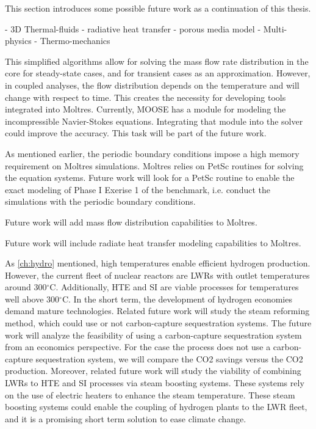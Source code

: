 This section introduces some possible future work as a continuation of this thesis.

- 3D Thermal-fluids
	- radiative heat transfer
	- porous media model
- Multi-physics
- Thermo-mechanics

This simplified algorithms allow for solving the mass flow rate distribution in the core for steady-state cases, and for transient cases as an approximation.
However, in coupled analyses, the flow distribution depends on the temperature and will change with respect to time.
This creates the necessity for developing tools integrated into Moltres.
Currently, MOOSE has a module for modeling the incompressible Navier-Stokes equations.
Integrating that module into the solver could improve the accuracy.
This task will be part of the future work.

As mentioned earlier, the periodic boundary conditions impose a high memory requirement on Moltres simulations.
Moltres relies on PetSc routines for solving the equation systems.
Future work will look for a PetSc routine to enable the exact modeling of Phase I Exerise 1 of the benchmark, i.e. conduct the simulations with the periodic boundary conditions.

Future work will add mass flow distribution capabilities to Moltres.

Future work will include radiate heat transfer modeling capabilities to Moltres.


As \ref{ch:hydro} mentioned, high temperatures enable efficient hydrogen production.
However, the current fleet of nuclear reactors are LWRs with outlet temperatures around 300$^{\circ}$C.
Additionally, HTE and SI are viable processes for temperatures well above 300$^{\circ}$C.
In the short term, the development of hydrogen economies demand mature technologies.
Related future work will study the steam reforming method, which could use or not carbon-capture sequestration systems.
The future work will analyze the feasibility of using a carbon-capture sequestration system from an economics perspective.
For the case the process does not use a carbon-capture sequestration system, we will compare the \gls{CO2} savings versus the \gls{CO2} production.
Moreover, related future work will study the viability of combining LWRs to HTE and SI processes via steam boosting systems.
These systems rely on the use of electric heaters to enhance the steam temperature.
These steam boosting systems could enable the coupling of hydrogen plants to the LWR fleet, and it is a promising short term solution to ease climate change.
